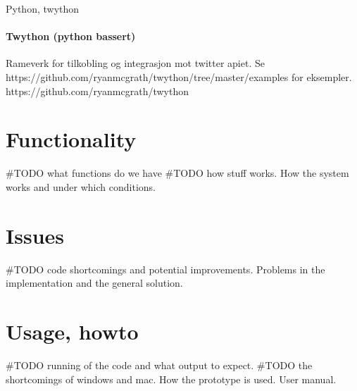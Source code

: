 Python, twython

\paragraph{Twython (python bassert)}
Rameverk for tilkobling og integrasjon mot twitter apiet.
Se https://github.com/ryanmcgrath/twython/tree/master/examples for eksempler.
https://github.com/ryanmcgrath/twython

\section{Functionality}
#TODO what functions do we have
#TODO how stuff works. 
How the system works and under which conditions.

\section{Issues}
#TODO code shortcomings and potential improvements. 
Problems in the implementation and the general solution.

\section{Usage, howto}
#TODO running of the code and what output to expect. 
#TODO the shortcomings of windows and mac. 
How the prototype is used. User manual. 

